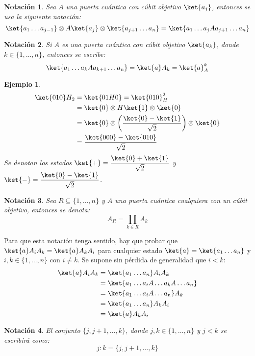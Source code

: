 \documentclass[10pt,conference,a4paper]{IEEEtran}
\newtheorem{notacion}{Notación}[subsection]
\newtheorem{ejemplo}{Ejemplo}
\begin{document}
\begin{notacion}
    Sea $A$ una puerta cuántica con cúbit objetivo $\ket{a_j}$, entonces se usa la siguiente notación:
    \begin{equation}
        \ket{a_1\ldots a_{j-1}}\otimes A\ket{a_j}\otimes \ket{a_{j+1}\ldots a_n}=\ket{a_1\ldots a_{j}Aa_{j+1}\ldots a_n}
        \label{not:3}
    \end{equation}
\end{notacion}

\begin{notacion}
    Si $A$ es una puerta cuántica con cúbit objetivo $\ket{a_k}$, donde $k\in\{1,\ldots, n\}$, entonces se escribe:
    \begin{equation}
        \ket{a_1\ldots a_k A a_{k+1}\ldots a_n}=\ket{a}A_k=\ket{a}_A^k
        \label{not:4}
    \end{equation}
\end{notacion}

\begin{ejemplo}
\begin{align*}
    \ket{010}H_2&=\ket{01H0}=\ket{010}_H^2\\
    &=\ket{0}\otimes H\ket{1}\otimes\ket{0}\\
    &=\ket{0}\otimes\left(\dfrac{\ket{0}-\ket{1}}{\sqrt{2}}\right)\otimes\ket{0}\\
    &=\dfrac{\ket{000}-\ket{010}}{\sqrt{2}}
\end{align*}
Se denotan los estados $\ket{+}=\dfrac{\ket{0}+\ket{1}}{\sqrt{2}}$ y $\ket{-}=\dfrac{\ket{0}-\ket{1}}{\sqrt{2}}$.
\end{ejemplo}
\vspace{1mm}
\begin{notacion}
    Sea $R\subseteq \{1,\ldots,n\}$ y $A$ una puerta cuántica cualquiera con un cúbit objetivo, entonces se denota:
    \begin{equation}
        A_R=\displaystyle\prod_{k\in R}A_k
        \label{not:5}
    \end{equation}
\end{notacion}
Para que esta notación tenga sentido, hay que probar que $\ket{a}A_iA_k=\ket{a}A_kA_i$ para cualquier estado $\ket{a}=\ket{a_1\ldots a_n}$ y $i,k\in\{1,\ldots,n\}$ con $i\neq k$. Se supone sin pérdida de generalidad que $i<k$:\\
\begin{align*}
    \ket{a}A_iA_k&=\ket{a_1\ldots a_n}A_iA_k\\
    &=\ket{a_1\ldots a_iA\ldots a_kA \ldots a_n}\\
    &=\ket{a_1\ldots a_iA \ldots a_n}A_k\\
    &=\ket{a_1\ldots a_n}A_k A_i\\
    &=\ket{a}A_kA_i
\end{align*}
\vspace{1mm}
\begin{notacion}
    El conjunto $\{j,j+1,\ldots,k\}$, donde $j,k\in\{1,\ldots,n\}$ y $j<k$ se escribirá como:
    \begin{equation}
        j:k= \{j,j+1,\ldots,k\}
        \label{not:6}
    \end{equation}
\end{notacion}
\end{document}
